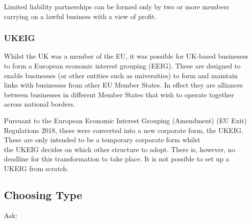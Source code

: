 \documentclass[
]{article}
\begin{document}
Limited liability partnerships can be formed only by two or more members
carrying on a lawful business with a view of profit.

\hypertarget{ukeig}{%
\subsubsection{UKEIG}\label{ukeig}}

Whilst the UK was a member of the EU, it was possible for UK-based
businesses to form a European economic interest grouping (EEIG). These
are designed to enable businesses (or other entities such as
universities) to form and maintain links with businesses from other EU
Member States. In effect they are alliances between businesses in
different Member States that wish to operate together across national
borders.

Pursuant to the European Economic Interest Grouping (Amendment) (EU
Exit) Regulations 2018, these were converted into a new corporate form,
the UKEIG. These are only intended to be a temporary corporate form
whilst\\
the UKEIG decides on which other structure to adopt. There is, however,
no deadline for this transformation to take place. It is not possible to
set up a UKEIG from scratch.

\hypertarget{choosing-type}{%
\subsection{Choosing Type}\label{choosing-type}}

Ask:
\end{document}
